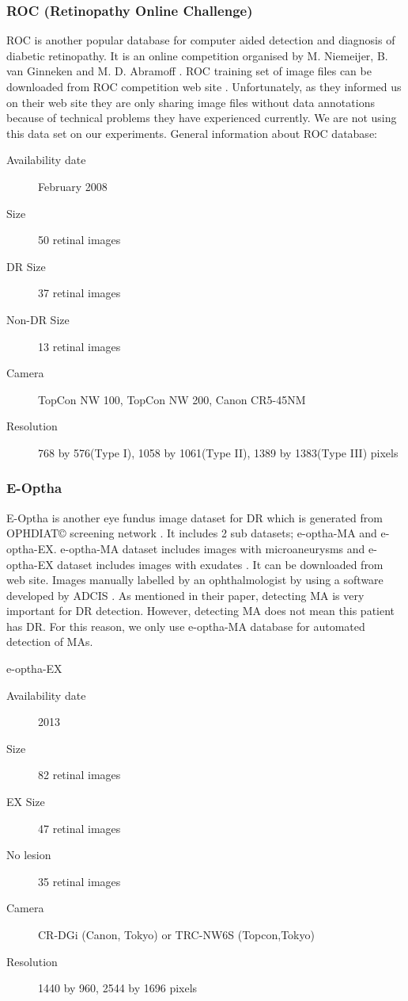 \subsubsection{ROC (Retinopathy Online Challenge)}

ROC is another popular database for computer aided detection and diagnosis of diabetic retinopathy. It is an online competition organised by M. Niemeijer, B. van Ginneken and M. D. Abramoff \citep{niemeijer2010retinopathy}. ROC training set of image files can be downloaded from ROC competition web site \citep{ROC}. Unfortunately, as they informed us on their web site \citet{ROC} they are only sharing image files without data annotations because of technical problems they have experienced currently. We are not using this data set on our experiments.
General information about ROC database:
\begin{description}
    \item[Availability date] February 2008
    \item[Size] 50 retinal images
    \item[DR Size] 37 retinal images
    \item[Non-DR Size] 13 retinal images
    \item[Camera] TopCon NW 100, TopCon NW 200, Canon CR5-45NM
    \item[Resolution] 768 by 576(Type I), 1058 by 1061(Type II), 1389 by 1383(Type III) pixels
\end{description}

\subsubsection{E-Optha}

E-Optha is another eye fundus image dataset for DR which is generated from OPHDIAT© screening network \citep{massin2008ophdiat}. It includes 2 sub datasets; e-optha-MA and e-optha-EX. e-optha-MA dataset includes images with microaneurysms and e-optha-EX dataset includes images with exudates . It can be downloaded from  \citet{E-Optha} web site. Images manually labelled by an ophthalmologist by using a software developed by ADCIS \citep{decenciere2013teleophta}. As \citet{niemeijer2010retinopathy} mentioned in their paper, detecting MA is very important for DR detection. However, detecting MA does not mean this patient has DR. For this reason, we only use e-optha-MA database for automated detection of MAs. 

e-optha-EX
\begin{description}
    \item[Availability date] 2013
    \item[Size] 82 retinal images
    \item[EX Size] 47 retinal images
    \item[No lesion] 35 retinal images
    \item[Camera] CR-DGi (Canon, Tokyo) or TRC-NW6S (Topcon,Tokyo) \citep{quellec2012multiple}
    \item[Resolution] 1440 by 960, 2544 by 1696 pixels
\end{description}

